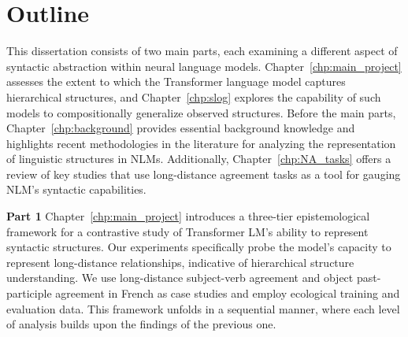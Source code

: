 \section{Outline}
This dissertation consists of two main parts, each examining a different aspect of syntactic abstraction within neural language models. Chapter~\ref{chp:main_project} assesses the extent to which the Transformer language model captures hierarchical structures, and Chapter~\ref{chp:slog} explores the capability of such models to compositionally generalize observed structures. 
Before the main parts, Chapter~\ref{chp:background} provides essential background knowledge and highlights recent methodologies in the literature for analyzing the representation of linguistic structures in NLMs. Additionally, Chapter~\ref{chp:NA_tasks} offers a review of key studies that use long-distance agreement tasks as a tool for gauging NLM's syntactic capabilities.

\noindent \textbf{Part 1 }  Chapter~\ref{chp:main_project} introduces a three-tier epistemological framework for a contrastive study of Transformer LM's ability to represent syntactic structures. Our experiments specifically probe the model's capacity to represent long-distance relationships, indicative of hierarchical structure understanding. We use long-distance subject-verb agreement and object past-participle agreement in French as case studies and employ ecological training and evaluation data. 
This framework unfolds in a sequential manner, where each level of analysis builds upon the findings of the previous one.


